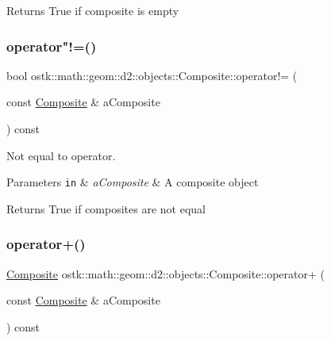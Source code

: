 \begin{DoxyReturn}{Returns}
True if composite is empty 
\end{DoxyReturn}
\mbox{\label{classostk_1_1math_1_1geom_1_1d2_1_1objects_1_1_composite_a227f543e777c7dfd0de5c50abe8518d8}} 
\subsubsection{\texorpdfstring{operator"!=()}{operator!=()}}
{\footnotesize\ttfamily bool ostk\+::math\+::geom\+::d2\+::objects\+::\+Composite\+::operator!= (\begin{DoxyParamCaption}\item[{const \hyperlink{classostk_1_1math_1_1geom_1_1d2_1_1objects_1_1_composite}{Composite} \&}]{a\+Composite }\end{DoxyParamCaption}) const}



Not equal to operator. 


\begin{DoxyParams}[1]{Parameters}
\mbox{\tt in}  & {\em a\+Composite} & A composite object \\
\hline
\end{DoxyParams}
\begin{DoxyReturn}{Returns}
True if composites are not equal 
\end{DoxyReturn}
\mbox{\label{classostk_1_1math_1_1geom_1_1d2_1_1objects_1_1_composite_af1230afaae174a571dd052d1e0a55e69}} 
\subsubsection{\texorpdfstring{operator+()}{operator+()}}
{\footnotesize\ttfamily \hyperlink{classostk_1_1math_1_1geom_1_1d2_1_1objects_1_1_composite}{Composite} ostk\+::math\+::geom\+::d2\+::objects\+::\+Composite\+::operator+ (\begin{DoxyParamCaption}\item[{const \hyperlink{classostk_1_1math_1_1geom_1_1d2_1_1objects_1_1_composite}{Composite} \&}]{a\+Composite }\end{DoxyParamCaption}) const}



